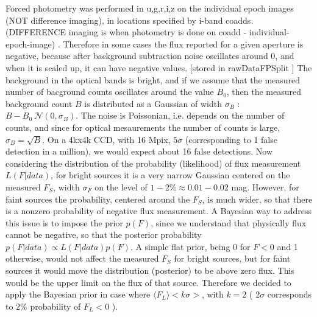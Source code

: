 \documentclass[fleqn,usenatbib]{mnras}  %
\begin{document}
Forced photometry was performed in u,g,r,i,z  on the individual epoch images (NOT difference imaging),  in locations specified by i-band coadds. (DIFFERENCE imaging is when photometry is done on  coadd - individual-epoch-image) . Therefore in some cases the flux reported for a given aperture is negative, because after background subtraction noise oscillates around 0, and when it is scaled up,  it can have negative values. [stored in rawDataFPSplit ]  The background in the  optical bands is bright, and if we assume that the measured number of bacground counts oscillates around the value $B_{0}$, then the measured background count $B$  is distributed as  a Gaussian of width $\sigma_{B}$ :   $B-B_{0}  ~  \mathcal{N}(0,\sigma_{B})$. The noise is Poissonian, i.e. depends on  the number of counts, and since for optical mesaurements the number of counts is large,  $\sigma_{B} = \sqrt {B}$. On a 4kx4k  CCD, with 16 Mpix, $5\sigma$ (corresponding  to  1 false detection in a million), we would expect about 16 false detections.  
Now considering the distribution of the probability (likelihood) of flux measurement   $L(F|data)$, for bright sources it is a very narrow Gaussian centered on the measured $F_{S}$, width $\sigma_{F}$ on the level of $1-2 \%  \approx 0.01-0.02$ mag. However, for faint sources the probability, centered around the $F_{S}$, is much wider, so that there is a nonzero probability of negative flux measurement. A Bayesian  way to address this issue is to impose the prior $p(F)$, since we understand that physically flux cannot be negative, so that the posterior probability $p(F|data) \propto L(F|data) p(F)$. A simple flat prior, being 0 for $F<0$ and 1 otherwise,  would not affect the measured $F_S$ for bright sources, but for faint sources it would move the distribution (posterior) to be above zero flux. This would be the upper limit on the flux of that source.  Therefore we decided to apply the Bayesian prior  in case where  $ \langle F_{L} \rangle  < k \sigma>$, with $k=2$ ( $2 \sigma$ corresponds to $2\%$ probability of $F_{L} < 0$ ). 
\end{document}
